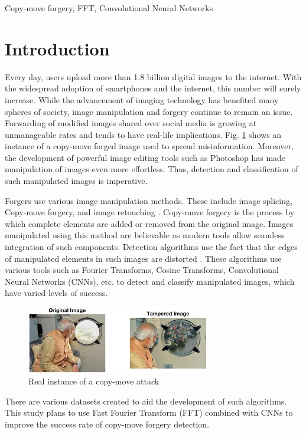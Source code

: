 \documentclass[conference]{IEEEtran}
\begin{document}
\begin{IEEEkeywords}
Copy-move forgery, FFT, Convolutional Neural Networks
\end{IEEEkeywords}

\section{Introduction}
Every day, users upload more than 1.8 billion digital images to the internet. With the widespread adoption of smartphones and the internet, this number will surely increase. While the advancement of imaging technology has benefited many spheres of society, image manipulation and forgery continue to remain an issue. Forwarding of modified images shared over social media is growing at unmanageable rates and tends to have real-life implications. Fig. \ref{modi} shows an instance of a copy-move forged image used to spread misinformation. Moreover, the development of powerful image editing tools such as Photoshop has made manipulation of images even more effortless. Thus, detection and classification of such manipulated images is imperative. 

Forgers use various image manipulation methods. These include image splicing, Copy-move forgery, and image retouching \cite{b1}. Copy-move forgery is the process by which complete elements are added or removed from the original image. Images manipulated using this method are believable as modern tools allow seamless integration of such components. Detection algorithms use the fact that the edges of manipulated elements in such images are distorted \cite{b2}. These algorithms use various tools such as Fourier Transforms, Cosine Transforms, Convolutional Neural Networks (CNNs), etc. \cite{b1} to detect and classify manipulated images, which have varied levels of success. 

\begin{figure}[htpb]
\centerline{\includegraphics[width=8cm]{modi.jpg}}
\caption{Real instance of a copy-move attack \cite{b14}}
\label{modi}
\end{figure}

There are various datasets created to aid the development of such algorithms. This study plans to use Fast Fourier Transform (FFT) \cite{b10} combined with CNNs to improve the success rate of copy-move forgery detection.
\end{document}

